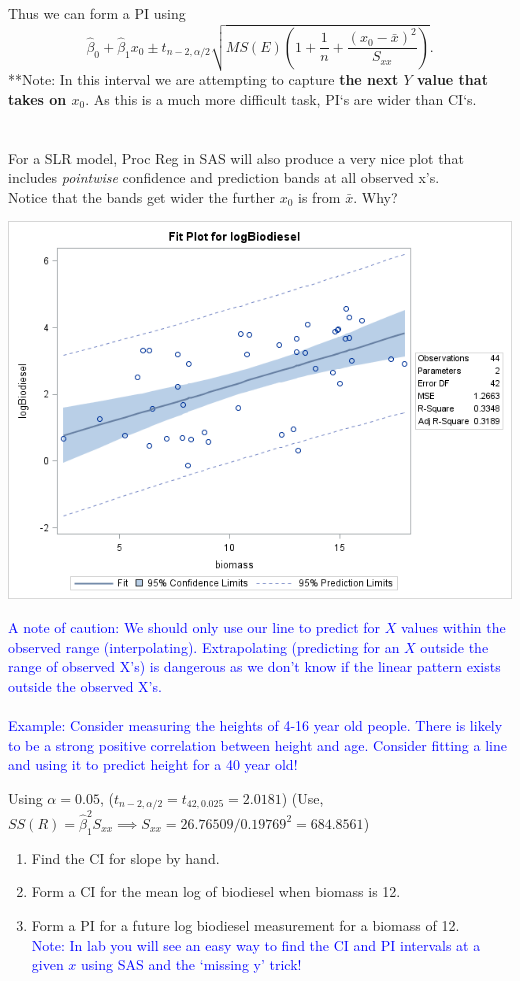 Thus we can form a PI using
$$\hat\beta_0 +\hat\beta_1 x_0 \pm t_{n-2,\alpha/2} \sqrt{MS(E)\left(1+\frac{1}{n}+\frac{(x_0-\bar{x})^2}{S_{xx}}\right)}. $$
**Note: In this interval we are attempting to capture \textbf{the next $Y$ value that takes on $x_0$}.  As this is a much more difficult task, PI`s are wider than CI`s.  \\~\\~\\

For a SLR model, Proc Reg in SAS will also produce a very nice plot that includes \textit{pointwise} confidence and prediction bands at all observed x's. \\
Notice that the bands get wider the further $x_0$ is from $\bar{x}$.  Why?

\begin{flushleft}
\includegraphics[scale=0.6]{biofitpred}
\end{flushleft}

\textcolor{blue}{A note of caution: We should only use our line to predict for $X$ values within the observed range (interpolating).  Extrapolating (predicting for an $X$ outside the range of observed X's) is dangerous as we don't know if the linear pattern exists outside the observed X's.\\~\\
Example: Consider measuring the heights of 4-16 year old people.  There is likely to be a strong positive correlation between height and age.  Consider fitting a line and using it to predict height for a 40 year old!}


Using $\alpha=0.05$, ($t_{n-2,\alpha/2}=t_{42,0.025}=2.0181$) (Use, $SS(R)=\hat{\beta}_1^2S_{xx}\implies S_{xx}=26.76509/0.19769^2=684.8561$)
\begin{enumerate}
\item Find the CI for slope by hand.
\item Form a CI for the mean log of biodiesel when biomass is 12.
\item Form a PI for a future log biodiesel measurement for a biomass of 12.\\
\textcolor{blue}{Note: In lab you will see an easy way to find the CI and PI intervals at a given $x$ using SAS and the `missing y' trick!}
\end{enumerate}

